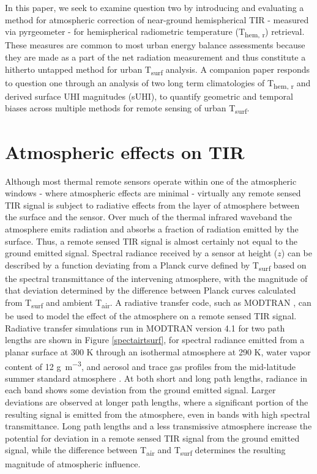 \begin{bibunit}
\noindent In this paper, we seek to examine question two by introducing and evaluating a method for atmospheric correction of near-ground hemispherical TIR - measured via pyrgeometer - for hemispherical radiometric temperature (T\textsubscript{hem, r}) retrieval. These measures are common to most urban energy balance assessments because they are made as a part of the net radiation measurement and thus constitute a hitherto untapped method for urban T\textsubscript{surf} analysis. A companion paper responds to question one through an analysis of two long term climatologies of T\textsubscript{hem, r} and derived surface UHI magnitudes (sUHI), to quantify geometric and temporal biases across multiple methods for remote sensing of urban T\textsubscript{surf}.

\section{Atmospheric effects on TIR}

Although most thermal remote sensors operate within one of the atmospheric windows - where atmospheric effects are minimal - virtually any remote sensed TIR signal is subject to radiative effects from the layer of atmosphere between the surface and the sensor. Over much of the thermal infrared waveband the atmosphere emits radiation and absorbs a fraction of radiation emitted by the surface. Thus, a remote sensed TIR signal is almost certainly not equal to the ground emitted signal. Spectral radiance received by a sensor at height ($z$) can be described by a function deviating from a Planck curve defined by T\textsubscript{surf} based on the spectral transmittance of the intervening atmosphere, with the magnitude of that deviation determined by the difference between Planck curves calculated from T\textsubscript{surf} and ambient T\textsubscript{air}. A radiative transfer code, such as MODTRAN \citep{Berk1987}, can be used to model the effect of the atmosphere on a remote sensed TIR signal. Radiative transfer simulations run in MODTRAN version 4.1 for two path lengths are shown in Figure \ref{spectairtsurf}, for spectral radiance emitted from a planar surface at 300 \si{\kelvin} through an isothermal atmosphere at 290 \si{\kelvin}, water vapor content of 12 \si{\gram\per\meter\cubed}, and aerosol and trace gas profiles from the mid-latitude summer standard atmosphere \citep{Kantor1962}. At both short and long path lengths, radiance in each band shows some deviation from the ground emitted signal. Larger deviations are observed at longer path lengths, where a significant portion of the resulting signal is emitted from the atmosphere, even in bands with high spectral transmittance. Long path lengths and a less transmissive atmosphere increase the potential for deviation in a remote sensed TIR signal from the ground emitted signal, while the difference between T\textsubscript{air} and T\textsubscript{surf} determines the resulting magnitude of atmospheric influence.


\end{bibunit}
